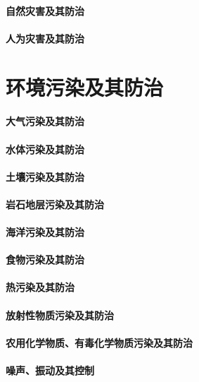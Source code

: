 \documentclass[UTF8]{../ApplicationUniverse}
\begin{document}
\subsubsection{自然灾害及其防治}
\subsubsection{人为灾害及其防治}




\chapter{环境污染及其防治}
\subsubsection{大气污染及其防治}
\subsubsection{水体污染及其防治}
\subsubsection{土壤污染及其防治}
\subsubsection{岩石地层污染及其防治}
\subsubsection{海洋污染及其防治}
\subsubsection{食物污染及其防治}
\subsubsection{热污染及其防治}
    \subsubsection{放射性物质污染及其防治}
    \subsubsection{农用化学物质、有毒化学物质污染及其防治}
    \subsubsection{噪声、振动及其控制}
\end{document}
